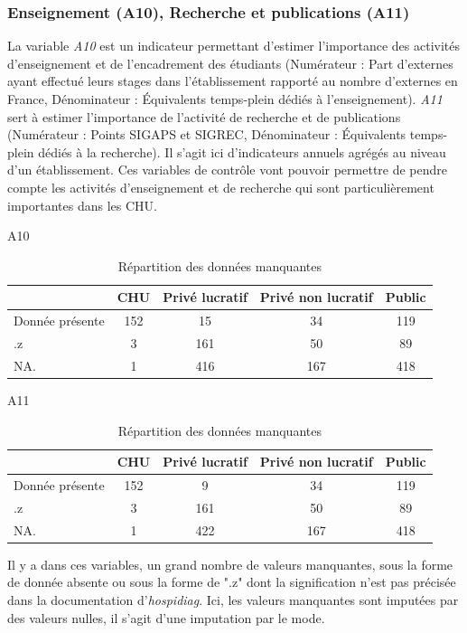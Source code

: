 \subsubsection*{Enseignement (A10), Recherche et publications (A11)}

La variable \textit{A10} est un indicateur permettant d'estimer l'importance des activités d'enseignement et de l'encadrement des étudiants (Numérateur : Part d'externes ayant effectué leurs stages dans l'établissement rapporté au nombre d'externes en France, Dénominateur : \'{E}quivalents temps-plein dédiés à l'enseignement). \textit{A11} sert à estimer l'importance de l'activité de recherche et de publications (Numérateur : Points SIGAPS et SIGREC, Dénominateur : \'{E}quivalents temps-plein dédiés à la recherche). Il s'agit ici d'indicateurs annuels agrégés au niveau d'un établissement. Ces variables de contrôle vont pouvoir permettre de pendre compte les activités d'enseignement et de recherche qui sont particulièrement importantes dans les CHU.\\

\begin{table}[ht]
\centering
\caption{Répartition des données manquantes}
A10
\begin{tabular}{l|cccc}
  \hline
 & CHU & Privé lucratif & Privé non lucratif & Public \\ 
  \hline
Donnée présente & 152 &  15 &  34 & 119 \\ 
  .z &   3 & 161 &  50 &  89 \\ 
  NA. &   1 & 416 & 167 & 418 \\ 
   \hline
\end{tabular}

\bigskip
A11
\begin{tabular}{l|cccc}
  \hline
 & CHU & Privé lucratif & Privé non lucratif & Public \\ 
  \hline
Donnée présente & 152 &   9 &  34 & 119 \\ 
  .z &   3 & 161 &  50 &  89 \\ 
  NA. &   1 & 422 & 167 & 418 \\ 
   \hline
\end{tabular}
\end{table}

\bigskip

Il y a dans ces variables, un grand nombre de valeurs manquantes, sous la forme de donnée absente ou sous la forme de ".z" dont la signification n'est pas précisée dans la documentation d'\textit{hospidiag}. Ici, les valeurs manquantes sont imputées par des valeurs nulles, il s'agit d'une imputation par le mode.\\



